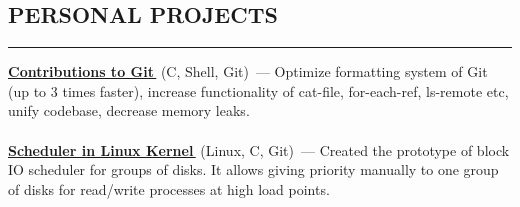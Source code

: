 \documentclass[11pt]{res} %
\let\orighref\href
\renewcommand{\href}[2]{\orighref{#1}{#2\,\faExternalLink}}
\begin{document}
 

 

\address{November 2018 \\ Saint Petersburg, Russia}

\address{\href{mailto:olyatelezhnaya@gmail.com}{olyatelezhnaya@gmail.com} \\
\href{https://github.com/telezhnaya}{github.com/telezhnaya} \\ +7 905 287 27 73}
                                             
\begin{resume}


\section{\uppercase{Personal Projects}}
\begin{spacing}{0.3}
\textcolor[RGB]{220,220,220}{\rule{\linewidth}{0.4pt}} 
\end{spacing}
\textbf{\href{https://github.com/git/git/commits?author=telezhnaya}{Contributions to Git}} (C, Shell, Git)~--- Optimize formatting system of Git (up to 3 times faster), increase functionality of cat-file, for-each-ref, ls-remote etc, unify codebase, decrease memory leaks. \\ \\
\textbf{\href{https://github.com/telezhnaya/linux}{Scheduler in Linux Kernel}} (Linux, C, Git)~--- Created the prototype of block IO scheduler for groups of disks. It allows giving priority manually to one group of disks for read/write processes at high load points.


\end{resume}
\end{document}
